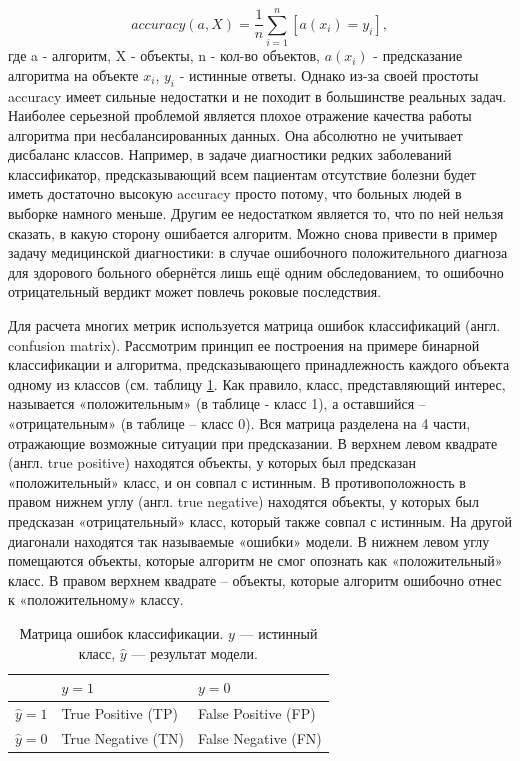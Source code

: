 \documentclass[a4paper,12pt]{extarticle}
\begin{document}
\begin{equation}
	\label{acc}
	accuracy(a, X) = \frac{1}{n}\sum_{i=1}^{n}[a(x_i)=y_i],
\end{equation}
где a - алгоритм, X - объекты, n - кол-во объектов,	$a(x_i)$ - предсказание алгоритма на объекте $x_i$,	$y_i$ - истинные ответы. Однако из-за своей простоты accuracy имеет сильные недостатки и не походит в большинстве реальных задач. Наиболее серьезной проблемой является плохое отражение качества работы алгоритма при несбалансированных данных. Она абсолютно не учитывает дисбаланс классов. Например, в задаче диагностики редких заболеваний классификатор, предсказывающий всем пациентам отсутствие болезни будет иметь достаточно высокую accuracy просто потому, что больных людей в выборке намного меньше. Другим ее недостатком является то, что по ней нельзя сказать, в какую сторону ошибается алгоритм. Можно снова привести в пример задачу медицинской диагностики: в случае ошибочного положительного диагноза для здорового больного обернётся лишь ещё одним обследованием, то ошибочно отрицательный вердикт может повлечь роковые последствия.

Для расчета многих метрик используется матрица ошибок классификаций (англ. confusion matrix). Рассмотрим принцип ее построения на примере бинарной классификации и алгоритма, предсказывающего принадлежность каждого объекта одному из классов (см. таблицу \ref{confusion_matr}. Как правило, класс, представляющий интерес, называется «положительным» (в таблице - класс 1), а оставшийся – «отрицательным» (в таблице – класс 0). Вся матрица разделена на 4 части, отражающие возможные ситуации при предсказании. В верхнем левом квадрате (англ. true positive) находятся объекты, у которых был предсказан «положительный» класс, и он совпал с истинным. В противоположность в правом нижнем углу (англ. true negative) находятся объекты, у которых был предсказан «отрицательный» класс, который также совпал с истинным. На другой диагонали находятся так называемые «ошибки» модели. В нижнем левом углу помещаются объекты, которые алгоритм не смог опознать как «положительный» класс. В правом верхнем квадрате – объекты, которые алгоритм ошибочно отнес к «положительному» классу.

\begin{table}[h]
	\centering
	\begin{tabular}{ | l | l | l | }
		\hline
		& $y = 1$ & $y = 0$ \\ \hline
		$\hat{y} = 1$ & True Positive (TP) & False Positive (FP) \\ \hline
		$\hat{y} = 0$ & True Negative (TN) & False Negative (FN) \\ \hline
	\end{tabular}
	\caption{Матрица ошибок классификации.
		$y$ — истинный класс, $\hat{y}$ — результат модели.}
	\label{confusion_matr}
\end{table}
\end{document}
